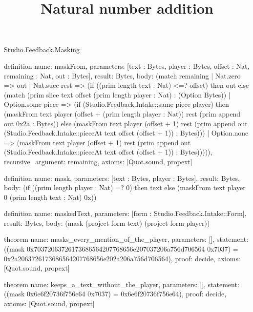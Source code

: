 \begin{lexlean}{Studio.Feedback.Masking}
\title{Natural number addition}
\begin{semanticmodule}
definition{
  name: maskFrom,
  parameters: [text : Bytes, player : Bytes, offset : Nat, remaining : Nat, out : Bytes],
  result: Bytes,
  body: (match remaining
    | Nat.zero => out
    | Nat.succ rest => (if ((prim length text : Nat) <=? offset) then out else (match (prim slice text offset (prim length player : Nat) : (Option Bytes))
      | Option.some piece => (if (Studio.Feedback.Intake::same piece player) then (maskFrom text player (offset + (prim length player : Nat)) rest (prim append out 0x2a : Bytes)) else (maskFrom text player (offset + 1) rest (prim append out (Studio.Feedback.Intake::pieceAt text offset (offset + 1)) : Bytes)))
      | Option.none => (maskFrom text player (offset + 1) rest (prim append out (Studio.Feedback.Intake::pieceAt text offset (offset + 1)) : Bytes))))),
  recursive_argument: remaining,
  axioms: [Quot.sound, propext]
}

definition{
  name: mask,
  parameters: [text : Bytes, player : Bytes],
  result: Bytes,
  body: (if ((prim length player : Nat) =? 0) then text else (maskFrom text player 0 (prim length text : Nat) 0x))
}

definition{
  name: maskedText,
  parameters: [form : Studio.Feedback.Intake::Form],
  result: Bytes,
  body: (mask (project form text) (project form player))
}

theorem{
  name: masks_every_mention_of_the_player,
  parameters: [],
  statement: ((mask 0x70372063726173686564207768656e207037206a756d706564 0x7037) = 0x2a2063726173686564207768656e202a206a756d706564),
  proof: decide{},
  axioms: [Quot.sound, propext]
}

theorem{
  name: keeps_a_text_without_the_player,
  parameters: [],
  statement: ((mask 0x6e6f20736f756e64 0x7037) = 0x6e6f20736f756e64),
  proof: decide{},
  axioms: [Quot.sound, propext]
}
\end{semanticmodule}
\end{lexlean}
